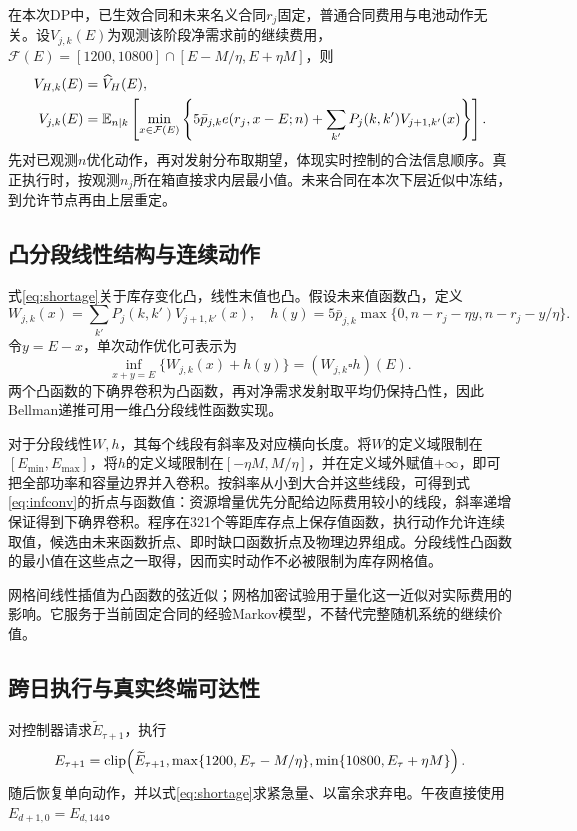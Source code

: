 \documentclass[UTF8,a4paper,zihao=-4,fontset=mac]{ctexart}
\begin{document}
在本次DP中，已生效合同和未来名义合同$r_j$固定，普通合同费用与电池动作无关。设$V_{j,k}(E)$为观测该阶段净需求前的继续费用，$\mathcal F(E)=[1200,10800]\cap[E-M/\eta,E+\eta M]$，则
\begin{align}
 V_{H,k}(E)&=\widehat V_H(E),\\
 V_{j,k}(E)&=\mathbb E_{n\mid k}\left[\min_{x\in\mathcal F(E)}
 \left\{5\bar p_{j,k}e(r_j,x-E;n)+\sum_{k'}P_j(k,k')V_{j+1,k'}(x)\right\}\right].\label{eq:bellman}
\end{align}
先对已观测$n$优化动作，再对发射分布取期望，体现实时控制的合法信息顺序。真正执行时，按观测$n_j$所在箱直接求内层最小值。未来合同在本次下层近似中冻结，到允许节点再由上层重定。

\subsection{凸分段线性结构与连续动作}
式\eqref{eq:shortage}关于库存变化凸，线性末值也凸。假设未来值函数凸，定义
\begin{equation}
 W_{j,k}(x)=\sum_{k'}P_j(k,k')V_{j+1,k'}(x),\quad
 h(y)=5\bar p_{j,k}\max\{0,n-r_j-\eta y,n-r_j-y/\eta\}.
\end{equation}
令$y=E-x$，单次动作优化可表示为
\begin{equation}
 \inf_{x+y=E}\{W_{j,k}(x)+h(y)\}=(W_{j,k}\square h)(E).\label{eq:infconv}
\end{equation}
两个凸函数的下确界卷积为凸函数，再对净需求发射取平均仍保持凸性，因此Bellman递推可用一维凸分段线性函数实现。

对于分段线性$W,h$，其每个线段有斜率及对应横向长度。将$W$的定义域限制在$[E_{\min},E_{\max}]$，将$h$的定义域限制在$[-\eta M,M/\eta]$，并在定义域外赋值$+\infty$，即可把全部功率和容量边界并入卷积。按斜率从小到大合并这些线段，可得到式\eqref{eq:infconv}的折点与函数值：资源增量优先分配给边际费用较小的线段，斜率递增保证得到下确界卷积。程序在321个等距库存点上保存值函数，执行动作允许连续取值，候选由未来函数折点、即时缺口函数折点及物理边界组成。分段线性凸函数的最小值在这些点之一取得，因而实时动作不必被限制为库存网格值。

网格间线性插值为凸函数的弦近似；网格加密试验用于量化这一近似对实际费用的影响。它服务于当前固定合同的经验Markov模型，不替代完整随机系统的继续价值。

\subsection{跨日执行与真实终端可达性}
对控制器请求$\widetilde E_{\tau+1}$，执行
\begin{equation}
 E_{\tau+1}=\operatorname{clip}\!\left(\widetilde E_{\tau+1},\max\{1200,E_\tau-M/\eta\},\min\{10800,E_\tau+\eta M\}\right).
\end{equation}
随后恢复单向动作，并以式\eqref{eq:shortage}求紧急量、以富余求弃电。午夜直接使用$E_{d+1,0}=E_{d,144}$。
\end{document}
